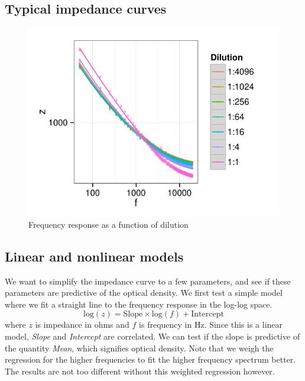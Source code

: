 \documentclass{article}\usepackage[]{graphicx}\usepackage[]{color}
\makeatletter
\def\maxwidth{ %
  \ifdim\Gin@nat@width>\linewidth
    \linewidth
  \else
    \Gin@nat@width
  \fi
}
\newenvironment{knitrout}{}{} %
\makeatother
\begin{document}
\subsection{Typical impedance curves} 
\begin{knitrout}
\color{fgcolor}\begin{figure}[]


{\centering \includegraphics[width=\maxwidth]{figure/impedance_curves} 

}

\caption[Frequency response as a function of dilution]{Frequency response as a function of dilution\label{fig:impedance_curves}}
\end{figure}


\end{knitrout}


\subsection{Linear and nonlinear models}
We want to simplify the impedance curve to a few parameters, and see if these parameters are predictive of the optical density. 
We first test a simple model where we fit a straight line to the frequency response in the log-log space. 
$$
\mathrm{log}(z) = \mathrm{Slope} \times \mathrm{log}(f) + \mathrm{Intercept}
$$
where $z$ is impedance in ohms and $f$ is frequency in Hz. Since this is a linear model, \emph{Slope} and \emph{Intercept} are correlated. We can test if the slope is predictive of the quantity \emph{Mean}, which signifies optical density. Note that we weigh the regression for the higher frequencies to fit the higher frequency spectrum better. The results are not too different without this weighted regression however. 
\end{document}
